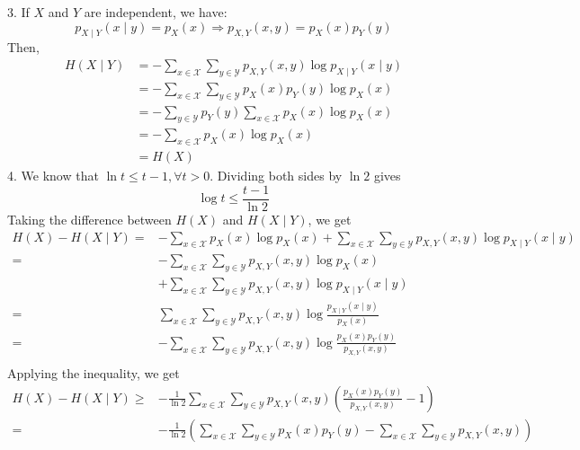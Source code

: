 \documentclass[11pt]{report}
\theoremstyle{lecturedefinition}
\theoremstyle{lectureremark}
\begin{document}
\begin{property}
3. If $X$ and $Y$ are independent, we have:
\begin{equation*}
    p_{X\mid Y}(x\mid y)=p_X(x)\Rightarrow p_{X,Y}(x,y)=p_X(x)p_Y(y)
\end{equation*}
Then,
\begin{equation*}
    \begin{aligned}
        H(X\mid Y)&=-\sum_{x\in\mathcal{X}}\sum_{y\in\mathcal{Y}}p_{X,Y}(x,y)\log p_{X\mid Y}(x\mid y)\\
        &=-\sum_{x\in\mathcal{X}}\sum_{y\in\mathcal{Y}}p_X(x)p_Y(y)\log p_X(x) \\
        &=-\sum_{y\in\mathcal{Y}}p_Y(y)\sum_{x\in\mathcal{X}}p_X(x)\log p_X(x)\\
        &=-\sum_{x\in\mathcal{X}}p_X(x)\log p_X(x)\\
        &=H(X)
    \end{aligned}
\end{equation*}
4. We know that $\ln t \le t-1,\forall t>0$. Dividing both sides by $\ln 2$ gives
\begin{equation*}
    \log t\le\frac{t-1}{\ln 2}
\end{equation*}
Taking the difference between $H(X)$ and $H(X\mid Y)$, we get
\begin{equation*}
\begin{aligned}
    H(X)-H(X\mid Y)=&-\sum_{x\in \mathcal{X}}p_X(x)\log p_X(x)+\sum_{x\in\mathcal{X}}\sum_{y\in\mathcal{Y}}p_{X,Y}(x,y)\log p_{X\mid Y}(x\mid y)\\
    =&-\sum_{x\in \mathcal{X}}\sum_{y\in\mathcal{Y}}p_{X,Y}(x,y)\log p_X(x)\\
    &+\sum_{x\in\mathcal{X}}\sum_{y\in\mathcal{Y}}p_{X,Y}(x,y)\log p_{X\mid Y}(x\mid y)\\
    =& \sum_{x\in\mathcal{X}}\sum_{y\in\mathcal{Y}}p_{X,Y}(x,y)\log\frac{p_{X\mid Y}(x\mid y)}{p_X(x)}\\
    =&-\sum_{x\in\mathcal{X}}\sum_{y\in\mathcal{Y}}p_{X,Y}(x,y)\log\frac{p_X(x)p_Y(y)}{p_{X, Y}(x, y)}\\
\end{aligned}
\end{equation*}
Applying the inequality, we get
\begin{equation*}
\begin{aligned}
    H(X)-H(X\mid Y)\ge&-\frac{1}{\ln 2}\sum_{x\in\mathcal{X}}\sum_{y\in\mathcal{Y}}p_{X,Y}(x,y)\left(\frac{p_X(x)p_Y(y)}{p_{X, Y}(x, y)}-1\right)\\
    =&-\frac{1}{\ln 2}\left(\sum_{x\in\mathcal{X}}\sum_{y\in\mathcal{Y}}p_X(x)p_Y(y)-\sum_{x\in\mathcal{X}}\sum_{y\in\mathcal{Y}}p_{X,Y}(x,y)\right)\\

\end{aligned}
\end{equation*}
\end{property}
\end{document}
